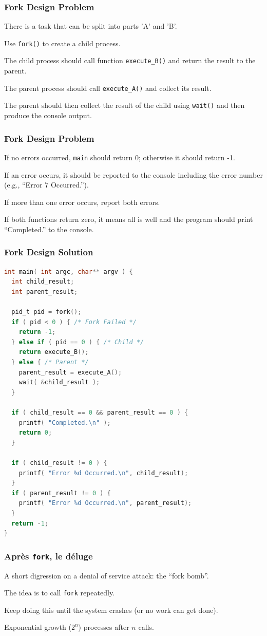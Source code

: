 \begin{frame}
\frametitle{Fork Design Problem}

There is a task that can be split into parts 'A' and 'B'. 

Use \texttt{fork()} to create a child process. 

The child process should call function \texttt{execute\_B()} and return the result to the parent. 

The parent process should call \texttt{execute\_A()} and collect its result.

The parent should then collect the result of the child using \texttt{wait()} and then produce the console output.

\end{frame}

\begin{frame}
\frametitle{Fork Design Problem}
If no errors occurred, \texttt{main} should return 0; otherwise it should return -1.

If an error occurs, it should be reported to the console including the error number (e.g., ``Error 7 Occurred.''). 

If more than one error occurs, report both errors. 

If both functions return zero, it means all is well and the program should print ``Completed.'' to the console.

\end{frame}


\begin{frame}[fragile]
\frametitle{Fork Design Solution}
\begin{lstlisting}[language=C]
int main( int argc, char** argv ) {
  int child_result;
  int parent_result;

  pid_t pid = fork();
  if ( pid < 0 ) { /* Fork Failed */
    return -1;
  } else if ( pid == 0 ) { /* Child */
    return execute_B();
  } else { /* Parent */ 
    parent_result = execute_A();
    wait( &child_result );
  }
  
  if ( child_result == 0 && parent_result == 0 ) {
    printf( "Completed.\n" );
    return 0;
  }
  
  if ( child_result != 0 ) {
    printf( "Error %d Occurred.\n", child_result);
  }
  if ( parent_result != 0 ) {
    printf( "Error %d Occurred.\n", parent_result);
  }
  return -1;
}
\end{lstlisting}
\end{frame}

\begin{frame}
\frametitle{Apr\`{e}s \texttt{fork}, le d\'{e}luge}

A short digression on a denial of service attack: the ``fork bomb''.

The idea is to call \texttt{fork} repeatedly.

Keep doing this until the system crashes (or no work can get done).

Exponential growth ($2^n$) processes after $n$ calls.

\end{frame}


